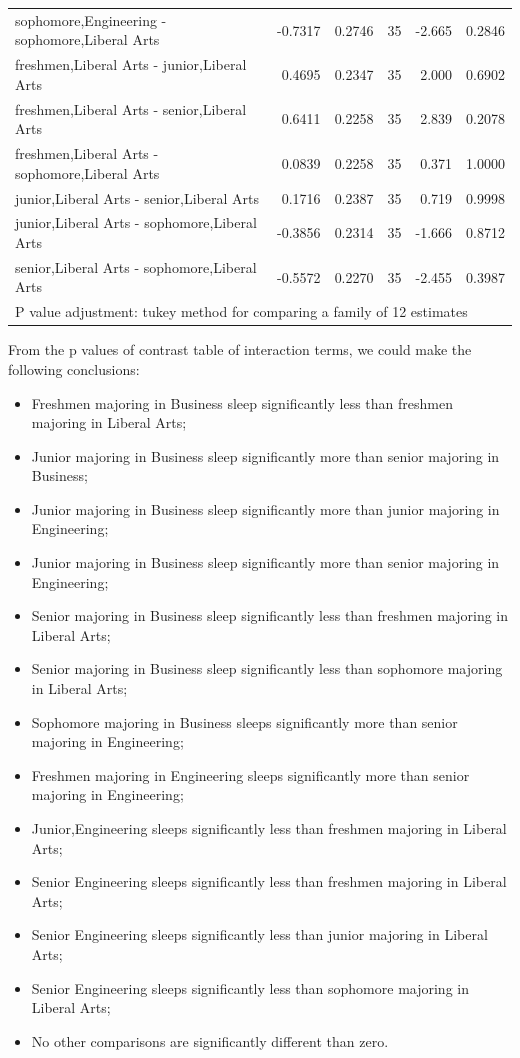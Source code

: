 \documentclass{article} %
\begin{document}
\begin{table}[H]
\begin{tabular}{|l|r|r|r|r|l|}
		sophomore,Engineering - sophomore,Liberal Arts & -0.7317 & 0.2746 & 35 & -2.665 & 0.2846 \\ 
		freshmen,Liberal Arts - junior,Liberal Arts & 0.4695 & 0.2347 & 35 & 2.000 & 0.6902 \\ 
		freshmen,Liberal Arts - senior,Liberal Arts & 0.6411 & 0.2258 & 35 & 2.839 & 0.2078 \\ 
		freshmen,Liberal Arts - sophomore,Liberal Arts & 0.0839 & 0.2258 & 35 & 0.371 & 1.0000 \\ 
		junior,Liberal Arts - senior,Liberal Arts & 0.1716 & 0.2387 & 35 & 0.719 & 0.9998 \\ 
		junior,Liberal Arts - sophomore,Liberal Arts & -0.3856 & 0.2314 & 35 & -1.666 & 0.8712 \\ 
		senior,Liberal Arts - sophomore,Liberal Arts & -0.5572 & 0.2270 & 35 & -2.455 & 0.3987 \\ 
		\hline
		\multicolumn{6}{l}{{\footnotesize P value adjustment: tukey method for comparing a family of 12 estimates}}\\
	\end{tabular}
\end{table}



From the p values of contrast table of interaction terms, we could make the following conclusions:


\begin{itemize}
\item  Freshmen majoring in Business sleep significantly less than freshmen majoring in Liberal Arts;
\item  Junior majoring in Business sleep significantly more than senior majoring in Business;
\item  Junior majoring in Business sleep significantly more than junior majoring in Engineering;
\item  Junior majoring in Business sleep significantly more than senior majoring in Engineering;
\item  Senior majoring in Business sleep significantly less than freshmen majoring in Liberal Arts;
\item  Senior majoring in Business sleep significantly less than sophomore majoring in Liberal Arts;
\item  Sophomore majoring in Business sleeps significantly more than senior majoring in Engineering;
\item  Freshmen majoring in Engineering sleeps significantly more than senior majoring in Engineering;
\item  Junior,Engineering sleeps significantly less than freshmen majoring in Liberal Arts;
\item  Senior Engineering sleeps significantly less than freshmen majoring in Liberal Arts;
\item  Senior Engineering sleeps significantly less than junior majoring in Liberal Arts;
\item  Senior Engineering sleeps significantly less than sophomore majoring in Liberal Arts;
\item  No other comparisons are significantly different than zero.
\end{itemize}
\[\]
\end{document}
